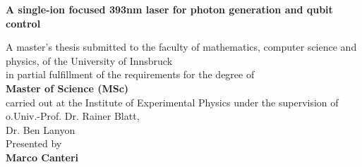 
\begin{titlepage}


 \thispagestyle{frontpage}

 \begin{center}

   \vspace*{6\baselineskip}


   {\Huge \textbf{A single-ion focused 393nm laser for photon generation and qubit control\\}}



       \vspace*{1,5\baselineskip}


   \vspace{1,5\baselineskip}

   \large{A master’s thesis submitted to the faculty of mathematics, computer science and physics, of the University of Innsbruck\\ in partial fulfillment of the requirements for the degree of\\\vspace{1,2\baselineskip}\textbf{Master of Science (MSc)} \\\vspace{1,2\baselineskip}carried out at the Institute of Experimental Physics under the supervision of}\\
   \large{o.Univ.-Prof.  Dr.  Rainer Blatt,}\\
   \large{Dr. Ben Lanyon}\\
    \vspace{1,2\baselineskip}
   \large{Presented by\\}
   \huge{\textbf{Marco Canteri}}\\
   \vfill
   \large{ }

 \end{center}

\end{titlepage}
